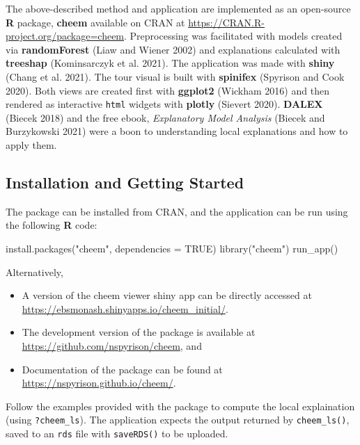 \documentclass[11pt,twoside]{article}
\newenvironment{Shaded}{\begin{snugshade}}{\end{snugshade}}
\newcommand{\AttributeTok}[1]{\textcolor[rgb]{0.77,0.63,0.00}{#1}}
\newcommand{\ConstantTok}[1]{\textcolor[rgb]{0.00,0.00,0.00}{#1}}
\newcommand{\FunctionTok}[1]{\textcolor[rgb]{0.00,0.00,0.00}{#1}}
\newcommand{\NormalTok}[1]{#1}
\newcommand{\StringTok}[1]{\textcolor[rgb]{0.31,0.60,0.02}{#1}}
\providecommand{\tightlist}{%
  \setlength{\itemsep}{0pt}\setlength{\parskip}{0pt}}
\begin{document}
The above-described method and application are implemented as an open-source \textbf{R} package, \textbf{cheem} available on CRAN at \url{https://CRAN.R-project.org/package=cheem}. Preprocessing was facilitated with models created via \textbf{randomForest} (Liaw and Wiener 2002) and explanations calculated with \textbf{treeshap} (Kominsarczyk et al. 2021). The application was made with \textbf{shiny} (Chang et al. 2021). The tour visual is built with \textbf{spinifex} (Spyrison and Cook 2020). Both views are created first with \textbf{ggplot2} (Wickham 2016) and then rendered as interactive \texttt{html} widgets with \textbf{plotly} (Sievert 2020). \textbf{DALEX} (Biecek 2018) and the free ebook, \emph{Explanatory Model Analysis} (Biecek and Burzykowski 2021) were a boon to understanding local explanations and how to apply them.

\hypertarget{installation-and-getting-started}{%
\subsection{Installation and Getting Started}\label{installation-and-getting-started}}

The package can be installed from CRAN, and the application can be run using the following \textbf{R} code:

\begin{Shaded}
\begin{Highlighting}[]
\FunctionTok{install.packages}\NormalTok{(}\StringTok{"cheem"}\NormalTok{, }\AttributeTok{dependencies =} \ConstantTok{TRUE}\NormalTok{)}
\FunctionTok{library}\NormalTok{(}\StringTok{"cheem"}\NormalTok{)}
\FunctionTok{run\_app}\NormalTok{()}
\end{Highlighting}
\end{Shaded}

Alternatively,

\begin{itemize}
\tightlist
\item
  A version of the cheem viewer shiny app can be directly accessed at
  \url{https://ebsmonash.shinyapps.io/cheem_initial/}.
\item
  The development version of the package is available at \url{https://github.com/nspyrison/cheem}, and
\item
  Documentation of the package can be found at \url{https://nspyrison.github.io/cheem/}.
\end{itemize}

Follow the examples provided with the package to compute the local explaination (using \texttt{?cheem\_ls}). The application expects the output returned by \texttt{cheem\_ls()}, saved to an \texttt{rds} file with \texttt{saveRDS()} to be uploaded.
\end{document}
